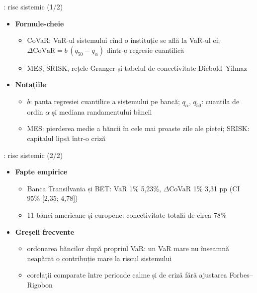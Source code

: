 \begin{frame}{: risc sistemic (1/2)}
\itemsize{\small}
\begin{itemize}
    \item \textbf{Formule-cheie}
    \begin{itemize}
        \item CoVaR: VaR-ul sistemului cînd o instituție se află la VaR-ul ei; $\Delta\mathrm{CoVaR} = b\,(q_{50} - q_\alpha)$ dintr-o regresie cuantilică 
        \item MES, SRISK, rețele Granger și tabelul de conectivitate Diebold--Yilmaz 
    \end{itemize}
    \item \textbf{Notațiile}
    \begin{itemize}
        \item $b$: panta regresiei cuantilice a sistemului pe bancă; $q_\alpha$, $q_{50}$: cuantila de ordin $\alpha$ și mediana randamentului băncii
        \item MES: pierderea medie a băncii în cele mai proaste zile ale pieței; SRISK: capitalul lipsă într-o criză
    \end{itemize}
\end{itemize}
\end{frame}

\begin{frame}{: risc sistemic (2/2)}
\itemsize{\small}
\begin{itemize}
    \item \textbf{Fapte empirice}
    \begin{itemize}
        \item Banca Transilvania și BET: VaR 1\% 5{,}23\%, $\Delta$CoVaR 1\% 3{,}31 pp (CI 95\% [2{,}35; 4{,}78])
        \item 11 bănci americane și europene: conectivitate totală de circa 78\%
    \end{itemize}
    \item \textbf{Greșeli frecvente}
    \begin{itemize}
        \item ordonarea băncilor după propriul VaR: un VaR mare nu înseamnă neapărat o contribuție mare la riscul sistemului
        \item corelații comparate între perioade calme și de criză fără ajustarea Forbes--Rigobon
    \end{itemize}
\end{itemize}
\end{frame}


